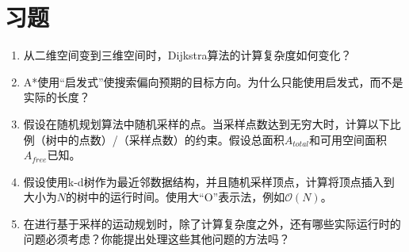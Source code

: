 \section*{习题}\small
\begin{enumerate}



\item 从二维空间变到三维空间时，Dijkstra算法的计算复杂度如何变化？
\item A*使用“启发式”使搜索偏向预期的目标方向。为什么只能使用启发式，而不是实际的长度？
\item 假设在随机规划算法中随机采样的点。当采样点数达到无穷大时，计算以下比例（树中的点数）/（采样点数）的约束。假设总面积$A_{total}$和可用空间面积$A_{free}$已知。

\item 假设使用k-d树作为最近邻数据结构，并且随机采样顶点，计算将顶点插入到大小为$N$的树中的运行时间。使用大“O”表示法，例如$\mathcal{O}(N)$。

\item 在进行基于采样的运动规划时，除了计算复杂度之外，还有哪些实际运行时的问题必须考虑？你能提出处理这些其他问题的方法吗？
\end{enumerate}
\normalsize